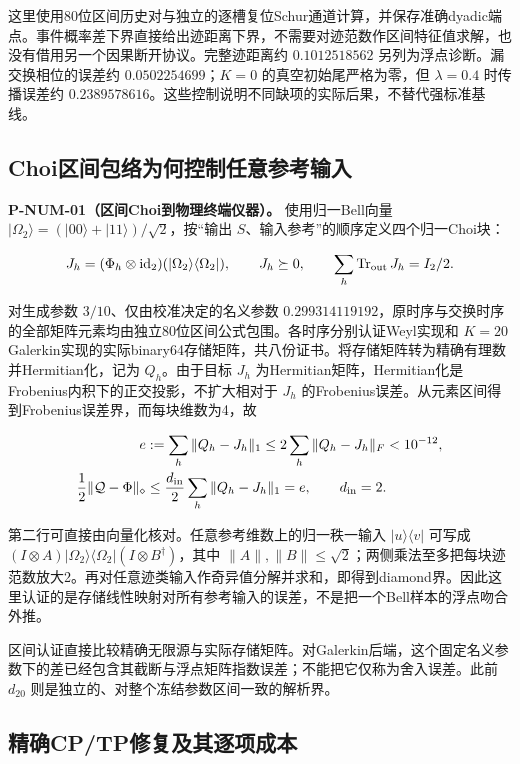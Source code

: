 \documentclass[
  11pt,
  oneside]{book}
\begin{document}
这里使用80位区间历史对与独立的逐槽复位Schur通道计算，并保存准确dyadic端点。事件概率差下界直接给出迹距离下界，不需要对迹范数作区间特征值求解，也没有借用另一个因果断开协议。完整迹距离约
\(0.1012518562\) 另列为浮点诊断。漏交换相位的误差约
\(0.0502254699\)；\(K=0\) 的真空初始尾严格为零，但 \(\lambda=0.4\)
时传播误差约
\(0.2389578616\)。这些控制说明不同缺项的实际后果，不替代强标准基线。

\subsection{Choi区间包络为何控制任意参考输入}

\protect\hypertarget{p-num-01}{}{}
\textbf{P-NUM-01（区间Choi到物理终端仪器）。} 使用归一Bell向量
\(|\Omega_2\rangle=(|00\rangle+|11\rangle)/\sqrt2\)，按``输出
\(S\)、输入参考''的顺序定义四个归一Choi块：

\[
J_h=(\Phi_h\otimes\operatorname{id}_2)
(|\Omega_2\rangle\langle\Omega_2|),
\qquad
J_h\succeq0,
\qquad \sum_h\operatorname{Tr}_{\rm out}J_h=I_2/2.
\]

对生成参数 \(3/10\)、仅由校准决定的名义参数
\(0.299314119192\)，原时序与交换时序的全部矩阵元素均由独立80位区间公式包围。各时序分别认证Weyl实现和
\(K=20\)
Galerkin实现的实际binary64存储矩阵，共八份证书。将存储矩阵转为精确有理数并Hermitian化，记为
\(Q_h\)。由于目标 \(J_h\)
为Hermitian矩阵，Hermitian化是Frobenius内积下的正交投影，不扩大相对于
\(J_h\)
的Frobenius误差。从元素区间得到Frobenius误差界，而每块维数为4，故

\[
\begin{aligned}
e&:=\sum_h\|Q_h-J_h\|_1
\le2\sum_h\|Q_h-J_h\|_F<10^{-12},\\
\frac12\|\mathcal Q-\Phi\|_\diamond
&\le\frac{d_{\rm in}}2\sum_h\|Q_h-J_h\|_1=e,
\qquad d_{\rm in}=2.
\end{aligned}
\]

第二行可直接由向量化核对。任意参考维数上的归一秩一输入
\(|u\rangle\langle v|\) 可写成
\((I\otimes A)|\Omega_2\rangle\langle\Omega_2|(I\otimes B^\dagger)\)，其中
\(\|A\|,\|B\|\le\sqrt2\)；两侧乘法至多把每块迹范数放大2。再对任意迹类输入作奇异值分解并求和，即得到diamond界。因此这里认证的是存储线性映射对所有参考输入的误差，不是把一个Bell样本的浮点吻合外推。

区间认证直接比较精确无限源与实际存储矩阵。对Galerkin后端，这个固定名义参数下的差已经包含其截断与浮点矩阵指数误差；不能把它仅称为舍入误差。此前
\(d_{20}\) 则是独立的、对整个冻结参数区间一致的解析界。

\subsection{精确CP/TP修复及其逐项成本}
\end{document}
